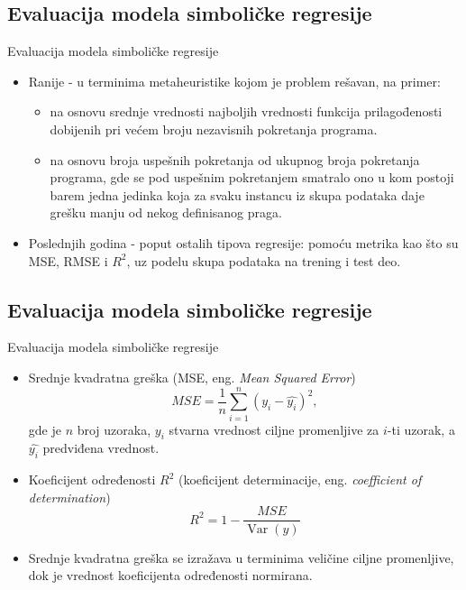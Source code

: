 \documentclass{beamer}
\begin{document}
\subsection{Evaluacija modela simboličke regresije}
\begin{frame}{Evaluacija modela simboličke regresije}
\begin{itemize}
    \item Ranije - u terminima metaheuristike kojom je problem rešavan, na primer:
    \begin{itemize}
        \item na osnovu srednje vrednosti najboljih vrednosti funkcija prilagod̄enosti dobijenih pri većem broju nezavisnih pokretanja programa.
        \item na osnovu broja uspešnih pokretanja od ukupnog broja pokretanja programa, gde se pod uspešnim pokretanjem smatralo ono u kom postoji barem jedna jedinka koja za svaku instancu iz skupa podataka daje grešku manju od nekog definisanog praga.
    \end{itemize}
    \item Poslednjih godina - poput ostalih tipova regresije: pomoću metrika kao što su MSE, RMSE i $R^2$, uz podelu skupa podataka na trening i test deo.
\end{itemize}
\end{frame}


\subsection{Evaluacija modela simboličke regresije}
\begin{frame}{Evaluacija modela simboličke regresije}
\begin{itemize}
    \item Srednje kvadratna greška (MSE, eng. \textit{Mean Squared Error})
     \[ MSE = \frac{1}{n} \sum_{i=1}^{n}(y_i - \hat{y_i})^{2}, \]
 gde je $n$ broj uzoraka, $y_i$ stvarna vrednost ciljne promenljive za $i$-ti uzorak, a $\hat{y_i}$ predviđena vrednost.
    \item Koeficijent određenosti $R^2$ (koeficijent determinacije, eng. \textit{coefficient of determination})
    \[ R^{2} = 1-\frac{MSE}{\operatorname{Var}(y)} \]
    \item Srednje kvadratna greška se izražava u terminima veličine ciljne promenljive, dok je vrednost koeficijenta određenosti normirana.
\end{itemize}
\end{frame}
\end{document}
